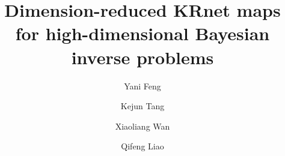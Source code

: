 \documentclass[review,12pt]{elsarticle}
\begin{document}
\begin{frontmatter}
		
            \title{Dimension-reduced KRnet maps for high-dimensional Bayesian inverse problems}
		
		
		\author[mymainaddress]{Yani Feng}
		\author[mysecondaryaddress]{Kejun Tang}
		
		\author[mythirdaddress]{Xiaoliang Wan}
		
		\author[mymainaddress]{Qifeng Liao}
		
		\address[mymainaddress]{School of Information Science and Technology, ShanghaiTech University, Shanghai 201210, China}
		\address[mysecondaryaddress]{Changsha Institute for Computing and Digital Economy, Peking University, Changsha 410205, China}
		\address[mythirdaddress]{Department of Mathematics and Center for Computation 
			and Technology, 
			Louisiana State University, Baton Rouge 70803, USA}
	

\end{frontmatter}
\end{document}

